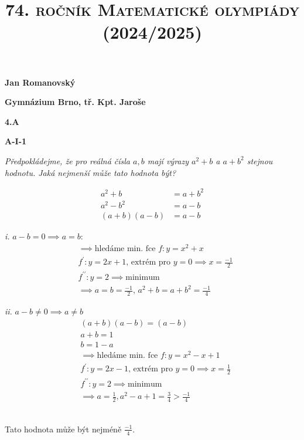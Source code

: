 \documentclass{article}
\title{\normalsize{\vspace{-2cm}\textsc{74. ročník Matematické olympiády (2024/2025)}\vspace{-1.7cm}}}
\date{}
\author{}
\begin{document}
\maketitle

\textbf{ }

\noindent \textbf{Jan Romanovský}

\noindent \textbf{Gymnázium Brno, tř. Kpt. Jaroše}

\noindent \textbf{4.A}

\noindent \textbf{A-\textrm{I}-1}

\textbf{ }

\textit{Předpokládejme, že pro reálná čísla $a, b$ mají výrazy $a^2 + b$ a $a + b^2$ stejnou hodnotu. Jaká nejmenší může tato hodnota být?}

\begin{align*}
  a^2 + b &= a + b^2\\
  a^2 - b^2 &= a-b\\
  (a+b)(a-b) &= a-b
\end{align*}

\textbf{ }

{\begin{minipage}[t]{0.49\textwidth}
    \textit{i.} $a-b=0 \implies a =b$:
  \begin{align*}
    &\implies \text{hledáme min. fce } f: y = x^2 + x\\
    &f^\prime :y = 2x + 1 \text{, extrém pro } y = 0 \implies x = \frac{-1}{2}\\
    &f^{\prime \prime}: y = 2 \implies \text{minimum}\\
    &\implies a = b = \frac{-1}{2} \text{, } a^2 + b = a + b^2 = \frac{-1}{4}
  \end{align*}
\end{minipage}
\hfill
\noindent\begin{minipage}[t]{0.49\textwidth}
    \textit{ii.} $a-b \neq 0 \implies a \neq b$
  \begin{align*}
    &(a+b)(a-b)=(a-b)\\
    &a+b = 1\\
  &b = 1-a\\
    &\implies \text{hledáme min. fce } f: y = x^2 -x +1\\
    &f^\prime: y = 2x -1 \text{, extrém pro } y = 0 \implies x = \frac{1}{2}\\
    &f^{\prime \prime}:y =2 \implies \text{minimum}\\
    &\implies a = \frac{1}{2}, a^2 - a + 1 = \frac{3}{4} > \frac{-1}{4}
  \end{align*}
\end{minipage}}

\,\\

Tato hodnota může být nejméně $\frac{-1}{4}$.
\end{document}
